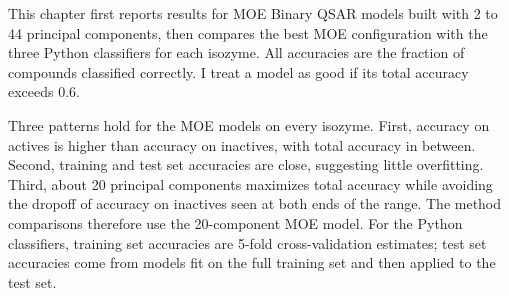 
This chapter first reports results for MOE Binary QSAR models built with 2 to 44 principal components, then compares the best MOE configuration with the three Python classifiers for each isozyme. All accuracies are the fraction of compounds classified correctly. I treat a model as good if its total accuracy exceeds 0.6.

Three patterns hold for the MOE models on every isozyme. First, accuracy on actives is higher than accuracy on inactives, with total accuracy in between. Second, training and test set accuracies are close, suggesting little overfitting. Third, about 20 principal components maximizes total accuracy while avoiding the dropoff of accuracy on inactives seen at both ends of the range. The method comparisons therefore use the 20-component MOE model. For the Python classifiers, training set accuracies are 5-fold cross-validation estimates; test set accuracies come from models fit on the full training set and then applied to the test set.
